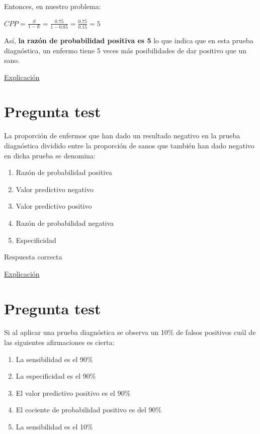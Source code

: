 \documentclass[
]{book}
\providecommand{\tightlist}{%
  \setlength{\itemsep}{0pt}\setlength{\parskip}{0pt}}
\begin{document}
Entonces, en nuestro problema:

\(CPP= \frac{S}{1-E}= \frac{0.75}{1-0.85}=\frac{0.75}{0.15}=5\)

Así, \textbf{la razón de probabilidad positiva es 5} lo que indica que en esta prueba diagnóstica, un enfermo tiene 5 veces más posibilidades de dar positivo que un sano.

\href{https://www.elsevier.es/es-revista-revista-argentina-radiologia-383-articulo-likelihood-ratio-razon-verosimilitud-definicion-S0048761916301910}{Explicación}

\hypertarget{pregunta-test-141}{%
\section{Pregunta test}\label{pregunta-test-141}}

La proporción de enfermos que han dado un resultado negativo en la prueba diagnóstica dividido entre la proporción de sanos que también han dado negativo en dicha prueba se denomina:

\begin{enumerate}
\def\labelenumi{\alph{enumi})}
\tightlist
\item
  Razón de probabilidad positiva
\item
  Valor predictivo negativo
\item
  Valor predictivo positivo
\item
  Razón de probabilidad negativa
\item
  Especificidad
\end{enumerate}

Respuesta correcta

\href{https://www.redalyc.org/journal/3555/355568264003/html/}{Explicación}

\hypertarget{pregunta-test-142}{%
\section{Pregunta test}\label{pregunta-test-142}}

Si al aplicar una prueba diagnóstica se observa un 10\% de falsos positivos cuál de las siguientes afirmaciones es cierta:

\begin{enumerate}
\def\labelenumi{\alph{enumi})}
\tightlist
\item
  La sensibilidad es el 90\%
\item
  La especificidad es el 90\%
\item
  El valor predictivo positivo es el 90\%
\item
  El cociente de probabilidad positivo es del 90\%
\item
  La sensibilidad es el 10\%
\end{enumerate}
\end{document}
